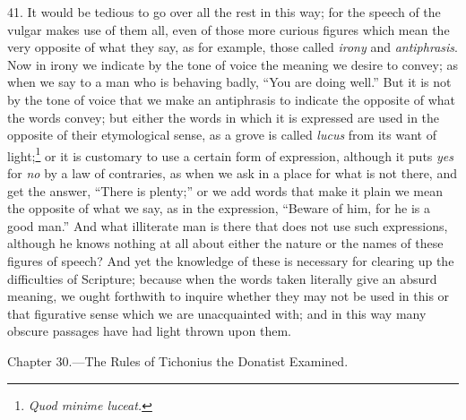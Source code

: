 41. It would be tedious to go over all the rest in this way; for the speech of the vulgar makes use of them all, even of those more curious figures which mean the very opposite of what they say, as for example, those called \emph{ irony} and \emph{antiphrasis}. Now in irony we indicate by the tone of voice the meaning we desire to convey; as when we say to a man who is behaving badly, “You are doing well.” But it is not by the tone of voice that we make an antiphrasis to indicate the opposite of what the words convey; but either the words in which it is expressed are used in the opposite of their etymological sense, as a grove is called \emph{lucus} from its want of light;\footnote{\emph{Quod minime luceat.}} or it is customary to use a certain form of expression, although it puts \emph{ yes} for \emph{no} by a law of contraries, as when we ask in a place for what is not there, and get the answer, “There is plenty;” or we add words that make it plain we mean the opposite of what we say, as in the expression, “Beware of him, for he is a good man.” And what illiterate man is there that does not use such expressions, although he knows nothing  at all about either the nature or the names of these figures of speech? And yet the knowledge of these is necessary for clearing up the difficulties of Scripture; because when the words taken literally give an absurd meaning, we ought forthwith to inquire whether they may not be used in this or that figurative sense which we are unacquainted with; and in this way many obscure passages have had light thrown upon them.


Chapter 30.—The Rules of Tichonius the Donatist Examined.

